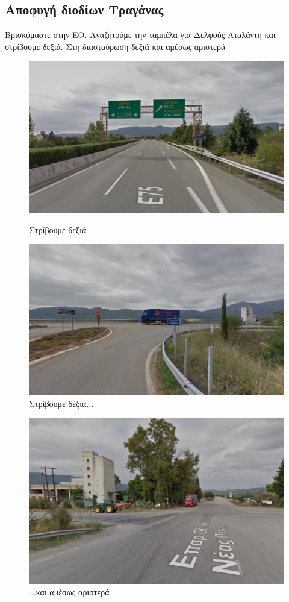 \newpage
\begin{center}
\section*{Αποφυγή διοδίων Τραγάνας}
\end{center}
Βρισκόμαστε στην ΕΟ. Αναζητούμε την ταμπέλα για Δελφούς-Αταλάντη και στρίβουμε δεξιά. Στη διασταύρωση δεξιά και αμέσως αριστερά
\begin{figure}[H]
\includegraphics[width=\textwidth]{images/lamia-athina/tragana/tragana_008.jpg}
\caption{Στρίβουμε δεξιά}
\includegraphics[width=\textwidth]{images/lamia-athina/tragana/tragana_009.jpg} 
\caption{Στρίβουμε δεξιά...}
\end{figure}
\begin{figure}[H]
\includegraphics[width=\textwidth]{images/lamia-athina/tragana/tragana_010.jpg} 
\caption{...και αμέσως αριστερά}
\end{figure}

